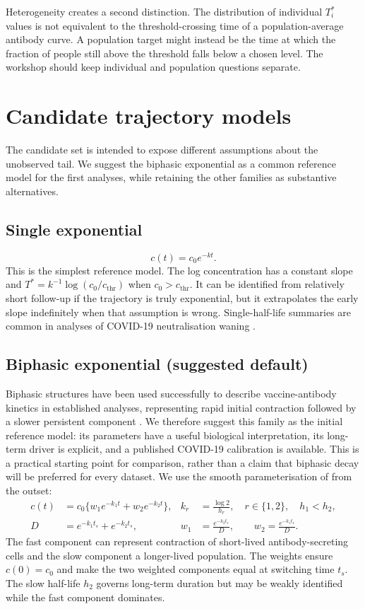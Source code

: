 \documentclass[11pt,a4paper]{article}
\begin{document}
Heterogeneity creates a second distinction. The distribution of individual $T_i^*$ values is not
equivalent to the threshold-crossing time of a population-average antibody curve. A population
target might instead be the time at which the fraction of people still above the threshold falls
below a chosen level. The workshop should keep individual and population questions separate.

\section{Candidate trajectory models}\label{sec:models}

The candidate set is intended to expose different assumptions about the unobserved tail. We
suggest the biphasic exponential as a common reference model for the first analyses, while
retaining the other families as substantive alternatives.

\subsection*{Single exponential}
\begin{equation}
  c(t)=c_0e^{-kt}.
\end{equation}
This is the simplest reference model. The log concentration has a constant slope and
$T^*=k^{-1}\log(c_0/c_{\mathrm{thr}})$ when $c_0>c_{\mathrm{thr}}$. It can be identified from
relatively short follow-up if the trajectory is truly exponential, but it extrapolates the early
slope indefinitely when that assumption is wrong. Single-half-life summaries are common in
analyses of COVID-19 neutralisation waning \parencite{khoury2021,cromer2022}.

\subsection*{Biphasic exponential (suggested default)}
Biphasic structures have been used successfully to describe vaccine-antibody kinetics in
established analyses, representing rapid initial contraction followed by a slower persistent
component \parencite{white2015,hogan2023}. We therefore suggest this family as the initial
reference model: its parameters have a useful biological interpretation, its long-term driver is
explicit, and a published COVID-19 calibration is available. This is a practical starting point
for comparison, rather than a claim that biphasic decay will be preferred for every dataset. We
use the smooth parameterisation of \textcite{hogan2023} from the outset:
\begin{align}
  c(t)&=c_0\{w_1e^{-k_1t}+w_2e^{-k_2t}\},
  & k_r&=\frac{\log 2}{h_r},\quad r\in\{1,2\},\quad h_1<h_2, \\
  D&=e^{-k_1t_s}+e^{-k_2t_s},
  & w_1&=\frac{e^{-k_2t_s}}{D},\qquad
    w_2=\frac{e^{-k_1t_s}}{D}.
  \label{eq:biphasic}
\end{align}
The fast component can represent contraction of short-lived antibody-secreting cells and the slow
component a longer-lived population. The weights ensure $c(0)=c_0$ and make the two weighted
components equal at switching time $t_s$. The slow half-life $h_2$ governs long-term duration but
may be weakly identified while the fast component dominates.
\end{document}
